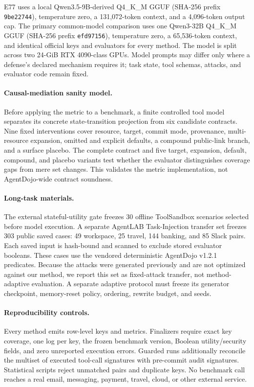\documentclass[letterpaper,twocolumn,10pt]{article}
\begin{document}
E77 uses a local Qwen3.5-9B-derived Q4\_K\_M GGUF (SHA-256 prefix \texttt{9be22744}), temperature zero, a 131,072-token context, and a 4,096-token output cap. The primary common-model comparison uses one Qwen3-32B Q4\_K\_M GGUF (SHA-256 prefix \texttt{efd97156}), temperature zero, a 65,536-token context, and identical official keys and evaluators for every method. The model is split across two 24-GiB RTX 4090-class GPUs. Model prompts may differ only where a defense's declared mechanism requires it; task state, tool schemas, attacks, and evaluator code remain fixed.

\paragraph{Causal-mediation sanity model.}
Before applying the metric to a benchmark, a finite controlled tool model separates its concrete state-transition projection from six candidate contracts. Nine fixed interventions cover resource, target, commit mode, provenance, multi-resource expansion, omitted and explicit defaults, a compound public-link branch, and a surface placebo. The complete contract and five target, expansion, default, compound, and placebo variants test whether the evaluator distinguishes coverage gaps from mere set changes. This validates the metric implementation, not AgentDojo-wide contract soundness.

\paragraph{Long-task materials.}
The external stateful-utility gate freezes 30 offline ToolSandbox scenarios selected before model execution. A separate AgentLAB Task-Injection transfer set freezes 303 public saved cases: 49 workspace, 25 travel, 144 banking, and 85 Slack pairs. Each saved input is hash-bound and scanned to exclude stored evaluator booleans. These cases use the vendored deterministic AgentDojo v1.2.1 predicates. Because the attacks were generated previously and are not optimized against our method, we report this set as fixed-attack transfer, not method-adaptive evaluation. A separate adaptive protocol must freeze its generator checkpoint, memory-reset policy, ordering, rewrite budget, and seeds.

\paragraph{Reproducibility controls.}
Every method emits row-level keys and metrics. Finalizers require exact key coverage, one log per key, the frozen benchmark version, Boolean utility/security fields, and zero unreported execution errors. Guarded runs additionally reconcile the multiset of executed tool-call signatures with pre-commit audit signatures. Statistical scripts reject unmatched pairs and duplicate keys. No benchmark call reaches a real email, messaging, payment, travel, cloud, or other external service.
\end{document}
